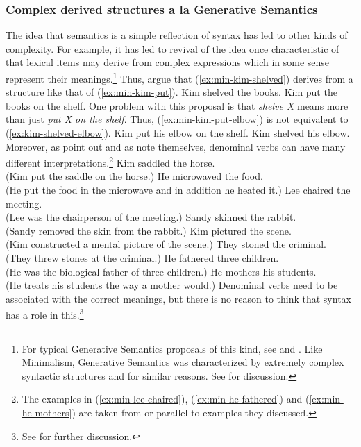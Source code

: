 \documentclass[output=paper]{langsci/langscibook}
\begin{document}
\subsubsection{Complex derived structures a la Generative Semantics}

The idea that semantics is a simple reflection of syntax has led to other kinds of complexity. For
example, it has led to revival of the idea once characteristic of  that lexical
items may derive from complex expressions which in some sense represent their meanings.\footnote{%
For typical Generative Semantics proposals of this kind, see  and
. Like Minimalism, Generative Semantics was characterized by extremely complex
syntactic structures and for similar reasons. See  for discussion.%
}
 Thus, \citet{HK93a-u} argue that (\ref{ex:min-kim-shelved}) derives from a structure like that of (\ref{ex:min-kim-put}).
\eal
\ex Kim shelved the books.\label{ex:min-kim-shelved}
\ex Kim put the books on the shelf.\label{ex:min-kim-put}
\zl
One problem with this proposal is that \emph{shelve X} means more than just \emph{put X on the shelf}. Thus, (\ref{ex:min-kim-put-elbow}) is not equivalent to (\ref{ex:kim-shelved-elbow}).
\eal 
\ex Kim put his elbow on the shelf.\label{ex:min-kim-put-elbow}
\ex Kim shelved his elbow.\label{ex:kim-shelved-elbow}
\zl 
Moreover, as \citet[--55]{CJ2005a} point out and as \citet[, Fn. 7]{HK93a-u} note
themselves, denominal verbs can have many different interpretations.\footnote{
  The examples in (\ref{ex:min-lee-chaired}), (\ref{ex:min-he-fathered}) and
  (\ref{ex:min-he-mothers}) are taken from \citep[--55]{CJ2005a} or parallel to examples they
  discussed.
}
\eal
\ex Kim saddled the horse.\\
(Kim put the saddle on the horse.)\label{ex:min-kim-saddled}
\ex He microwaved the food.\\
(He put the food in the microwave and in addition he heated it.)
\ex Lee chaired the meeting.\\
(Lee was the chairperson of the meeting.)\label{ex:min-lee-chaired}
\ex Sandy skinned the rabbit.\\
(Sandy removed the skin from the rabbit.)\label{ex:min-sandy-skinned}
\ex Kim pictured the scene.\\
(Kim constructed a mental picture of the scene.)\label{ex:min-kim-pictured}
\ex They stoned the criminal.\\
(They threw stones at the criminal.)\label{ex:min-they-stoned}
\ex He fathered three children.\\
(He was the biological father of three children.)\label{ex:min-he-fathered}
\ex He mothers his students.\\
(He treats his students the way a mother would.)\label{ex:min-he-mothers}
\zl
Denominal verbs need to be associated with the correct meanings, but there is no reason to think that syntax has a role in this.\footnote{%
See \citet[53--56]{CJ2005a} for further discussion.%
}
\end{document}
